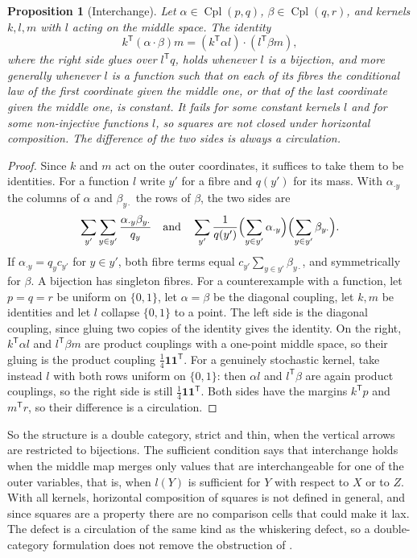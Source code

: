 \documentclass[11pt]{article}
\newtheorem{proposition}[theorem]{Proposition}
\theoremstyle{definition}
\theoremstyle{remark}
\newcommand{\Cpl}{\operatorname{Cpl}}
\newcommand{\T}{\mathsf T}
\begin{document}
\begin{proposition}[Interchange]\label{prop:double}
Let $\alpha\in\Cpl(p,q)$, $\beta\in\Cpl(q,r)$, and kernels $k,l,m$ with $l$ acting on the middle space. The identity
\[
k^\T(\alpha\cdot\beta)m=(k^\T\alpha l)\cdot(l^\T\beta m),
\]
where the right side glues over $l^\T q$, holds whenever $l$ is a bijection, and more generally whenever $l$ is a function such that on each of its fibres the
conditional law of the first coordinate given the middle one, or that of the last coordinate given the middle one, is
constant. It fails for some constant kernels $l$ and for some non-injective functions $l$, so squares are
not closed under horizontal composition. The difference of the two sides is always a circulation.
\end{proposition}
\begin{proof}
Since $k$ and $m$ act on the outer coordinates, it suffices to take them to be identities. For a function $l$ write $y'$ for a
fibre and $q(y')$ for its mass. With $\alpha_{\cdot y}$ the columns of $\alpha$ and $\beta_{y\cdot}$ the rows of $\beta$, the two sides are
\[
\sum_{y'}\sum_{y\in y'}\frac{\alpha_{\cdot y}\beta_{y\cdot}}{q_y}
\quad\text{and}\quad
\sum_{y'}\frac1{q(y')}\Bigl(\sum_{y\in y'}\alpha_{\cdot y}\Bigr)\Bigl(\sum_{y\in y'}\beta_{y\cdot}\Bigr).
\]
If $\alpha_{\cdot y}=q_y c_{y'}$ for $y\in y'$, both fibre terms equal
$c_{y'}\sum_{y\in y'}\beta_{y\cdot}$, and symmetrically for $\beta$. A bijection has singleton fibres. For a counterexample with a function, let
$p=q=r$ be uniform on $\{0,1\}$, let $\alpha=\beta$ be the diagonal coupling, let $k,m$ be identities and let $l$ collapse
$\{0,1\}$ to a point. The left side is the diagonal coupling, since gluing two copies of the identity gives the identity. On
the right, $k^\T\alpha l$ and $l^\T\beta m$ are product couplings with a one-point middle space, so their gluing is the product
coupling $\frac14\mathbf 1\mathbf 1^\T$. For a genuinely stochastic kernel, take instead $l$ with both rows uniform on $\{0,1\}$: then
$\alpha l$ and $l^\T\beta$ are again product couplings, so the right side is still $\frac14\mathbf 1\mathbf 1^\T$. Both sides have the margins
$k^\T p$ and $m^\T r$, so their difference is a circulation.
\end{proof}

So the structure is a double category, strict and thin, when the vertical arrows are restricted to bijections. The
sufficient condition says that interchange holds when the middle map merges only values that are interchangeable for one
of the outer variables, that is, when $l(Y)$ is sufficient for $Y$ with respect to $X$ or to $Z$. With all
kernels, horizontal composition of squares is not defined in general, and since squares are a property there are no
comparison cells that could make it lax. The defect is a circulation of the same kind as the whiskering defect, so a
double-category formulation does not remove the obstruction of \cite[Thm.~7.6(v)]{Attribution}.
\end{document}
